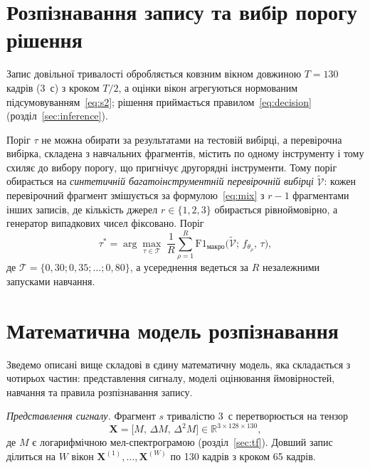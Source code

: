 \section{Розпізнавання запису та вибір порогу рішення}
\label{sec:threshold}

Запис довільної тривалості обробляється ковзним вікном довжиною
$T = 130$ кадрів (3~с) з кроком $T/2$, а оцінки вікон агрегуються
нормованим підсумовуванням~\eqref{eq:s2}; рішення приймається
правилом~\eqref{eq:decision} (розділ~\ref{sec:inference}).

Поріг $\tau$ не можна обирати за результатами на тестовій вибірці, а
перевірочна вибірка, складена з навчальних фрагментів, містить по одному
інструменту і тому схиляє до вибору порогу, що пригнічує другорядні
інструменти. Тому поріг обирається на \textit{синтетичній
багатоінструментній перевірочній вибірці} $\widetilde{\mathcal{V}}$:
кожен перевірочний фрагмент змішується за формулою~\eqref{eq:mix} з
$r - 1$ фрагментами інших записів, де кількість джерел $r \in \{1, 2, 3\}$
обирається рівноймовірно, а генератор випадкових чисел фіксовано. Поріг
\begin{equation}
    \tau^{*} = \arg\max_{\tau \in \mathcal{T}} \;
    \frac{1}{R} \sum_{\rho=1}^{R}
    \mathrm{F1}_{\text{макро}}\big(\widetilde{\mathcal{V}};\, f_{\theta_\rho},\, \tau\big),
\end{equation}
де $\mathcal{T} = \{0{,}30; 0{,}35; \ldots; 0{,}80\}$, а усереднення
ведеться за $R$ незалежними запусками навчання.

\section{Математична модель розпізнавання}
\label{sec:mathmodel}

Зведемо описані вище складові в єдину математичну модель, яка складається
з чотирьох частин: представлення сигналу, моделі оцінювання ймовірностей,
навчання та правила розпізнавання запису.

\textit{Представлення сигналу.} Фрагмент $s$ тривалістю 3~с
перетворюється на тензор
\begin{equation}
    \mathbf{X} = \big[M,\, \Delta M,\, \Delta^2 M\big] \in \mathbb{R}^{3 \times 128 \times 130},
\end{equation}
де $M$ є логарифмічною мел-спектрограмою (розділ~\ref{sec:tf}). Довший
запис ділиться на $W$ вікон $\mathbf{X}^{(1)}, \ldots, \mathbf{X}^{(W)}$
по 130 кадрів з кроком 65 кадрів.

